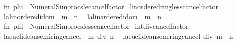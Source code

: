 \begin{isabellebody}
\ \ {\isacartoucheopen}fn\ phi\ {\isacharequal}{\kern0pt}{\isachargreater}{\kern0pt}\ Numeral{\isacharunderscore}{\kern0pt}Simprocs{\isachardot}{\kern0pt}le{\isacharunderscore}{\kern0pt}cancel{\isacharunderscore}{\kern0pt}factor{\isacartoucheclose}\isanewline
\isanewline
{}\isamarkupfalse%
\ linordered{\isacharunderscore}{\kern0pt}ring{\isacharunderscore}{\kern0pt}less{\isacharunderscore}{\kern0pt}cancel{\isacharunderscore}{\kern0pt}factor\isanewline
\ \ {\isacharparenleft}{\kern0pt}{\isachardoublequoteopen}{\isacharparenleft}{\kern0pt}l{\isacharcolon}{\kern0pt}{\isacharcolon}{\kern0pt}{\isacharprime}{\kern0pt}a{\isacharcolon}{\kern0pt}{\isacharcolon}{\kern0pt}linordered{\isacharunderscore}{\kern0pt}idom{\isacharparenright}{\kern0pt}\ {\isacharasterisk}{\kern0pt}\ m\ {\isacharless}{\kern0pt}\ n{\isachardoublequoteclose}\isanewline
\ \ {\isacharbar}{\kern0pt}{\isachardoublequoteopen}{\isacharparenleft}{\kern0pt}l{\isacharcolon}{\kern0pt}{\isacharcolon}{\kern0pt}{\isacharprime}{\kern0pt}a{\isacharcolon}{\kern0pt}{\isacharcolon}{\kern0pt}linordered{\isacharunderscore}{\kern0pt}idom{\isacharparenright}{\kern0pt}\ {\isacharless}{\kern0pt}\ m\ {\isacharasterisk}{\kern0pt}\ n{\isachardoublequoteclose}{\isacharparenright}{\kern0pt}\ {\isacharequal}{\kern0pt}\isanewline
\ \ {\isacartoucheopen}fn\ phi\ {\isacharequal}{\kern0pt}{\isachargreater}{\kern0pt}\ Numeral{\isacharunderscore}{\kern0pt}Simprocs{\isachardot}{\kern0pt}less{\isacharunderscore}{\kern0pt}cancel{\isacharunderscore}{\kern0pt}factor{\isacartoucheclose}\isanewline
\isanewline
{}\isamarkupfalse%
\ int{\isacharunderscore}{\kern0pt}div{\isacharunderscore}{\kern0pt}cancel{\isacharunderscore}{\kern0pt}factor\isanewline
\ \ {\isacharparenleft}{\kern0pt}{\isachardoublequoteopen}{\isacharparenleft}{\kern0pt}{\isacharparenleft}{\kern0pt}l{\isacharcolon}{\kern0pt}{\isacharcolon}{\kern0pt}{\isacharprime}{\kern0pt}a{\isacharcolon}{\kern0pt}{\isacharcolon}{\kern0pt}euclidean{\isacharunderscore}{\kern0pt}semiring{\isacharunderscore}{\kern0pt}cancel{\isacharparenright}{\kern0pt}\ {\isacharasterisk}{\kern0pt}\ m{\isacharparenright}{\kern0pt}\ div\ n{\isachardoublequoteclose}\isanewline
\ \ {\isacharbar}{\kern0pt}{\isachardoublequoteopen}{\isacharparenleft}{\kern0pt}l{\isacharcolon}{\kern0pt}{\isacharcolon}{\kern0pt}{\isacharprime}{\kern0pt}a{\isacharcolon}{\kern0pt}{\isacharcolon}{\kern0pt}euclidean{\isacharunderscore}{\kern0pt}semiring{\isacharunderscore}{\kern0pt}cancel{\isacharparenright}{\kern0pt}\ div\ {\isacharparenleft}{\kern0pt}m\ {\isacharasterisk}{\kern0pt}\ n{\isacharparenright}{\kern0pt}{\isachardoublequoteclose}{\isacharparenright}{\kern0pt}\ {\isacharequal}{\kern0pt}\isanewline

\end{isabellebody}
